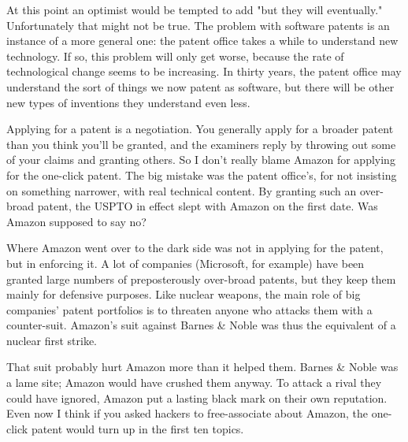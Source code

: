At this point an
                  optimist would be tempted to add "but they will eventually."
                  Unfortunately that might not be true. The problem with
                  software patents is an instance of a more general one: the
                  patent office takes a while to understand new technology. If
                  so, this problem will only get worse, because the rate of
                  technological change seems to be increasing. In thirty years,
                  the patent office may understand the sort of things we now
                  patent as software, but there will be other new types of
                  inventions they understand even less.

Applying for
                  a patent is a negotiation. You generally apply for a broader
                  patent than you think you'll be granted, and the examiners
                  reply by throwing out some of your claims and granting others.
                  So I don't really blame Amazon for applying for the one-click
                  patent. The big mistake was the patent office's, for not
                  insisting on something narrower, with real technical content.
                  By granting such an over-broad patent, the USPTO in effect
                  slept with Amazon on the first date. Was Amazon supposed to
                  say no?

Where Amazon went over to the dark side was
                  not in applying for the patent, but in enforcing it. A lot of
                  companies (Microsoft, for example) have been granted large
                  numbers of preposterously over-broad patents, but they keep
                  them mainly for defensive purposes. Like nuclear weapons, the
                  main role of big companies' patent portfolios is to threaten
                  anyone who attacks them with a counter-suit. Amazon's suit
                  against Barnes \& Noble was thus the equivalent of a nuclear
                  first strike.

That suit probably hurt Amazon more
                  than it helped them. Barnes \& Noble was a lame site; Amazon
                  would have crushed them anyway. To attack a rival they could
                  have ignored, Amazon put a lasting black mark on their own
                  reputation. Even now I think if you asked hackers to
                  free-associate about Amazon, the one-click patent would turn
                  up in the first ten topics.

